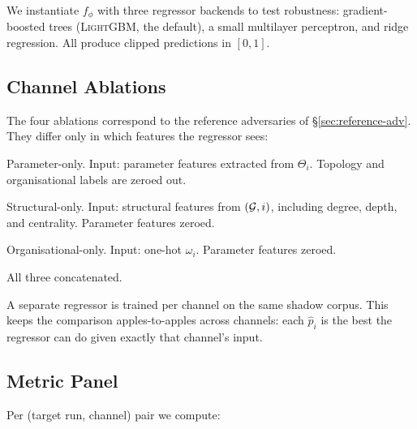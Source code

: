 We instantiate $f_\phi$ with three regressor backends to test
robustness: gradient-boosted trees (\textsc{LightGBM}, the default), a
small multilayer perceptron, and ridge regression. All produce
clipped predictions in $[0,1]$.

\subsection{Channel Ablations}
\label{sec:attack-channels}

The four ablations correspond to the reference adversaries of
\S\ref{sec:reference-adv}. They differ only in which features the
regressor sees:

\begin{description}[itemsep=2pt,leftmargin=*]
\item[$\Adv_1$] Parameter-only. Input: parameter features extracted from
  $\Theta_i$. Topology and organisational labels are zeroed out.
\item[$\Adv_2^{\text{topo}}$] Structural-only. Input: structural features
  from $(\mathcal{G},i)$, including degree, depth, and centrality. Parameter features
  zeroed.
\item[$\Adv_2^{\text{org}}$] Organisational-only. Input: one-hot
  $\omega_i$. Parameter features zeroed.
\item[$\Adv_2^{\text{full}}$] All three concatenated.
\end{description}

A separate regressor is trained per channel on the same shadow corpus.
This keeps the comparison apples-to-apples across channels: each
$\hat p_i$ is the best the regressor can do given exactly that channel's
input.

\subsection{Metric Panel}
\label{sec:attack-metrics}

Per (target run, channel) pair we compute:


